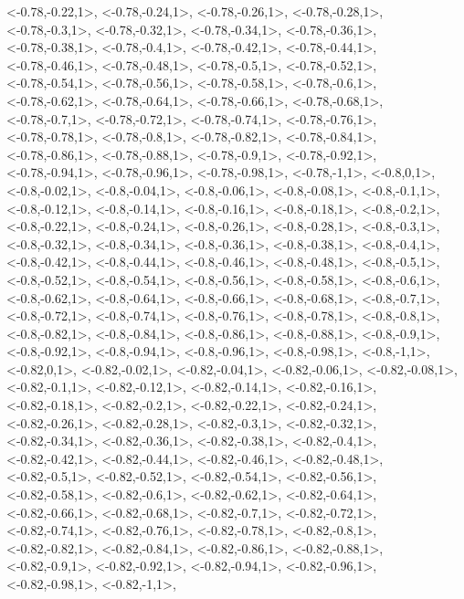 \documentclass[a4paper,10pt]{article}
\begin{document}
\begin{eulernotebook}
\begin{euleroutput}
  <-0.78,-0.22,1>,
  <-0.78,-0.24,1>,
  <-0.78,-0.26,1>,
  <-0.78,-0.28,1>,
  <-0.78,-0.3,1>,
  <-0.78,-0.32,1>,
  <-0.78,-0.34,1>,
  <-0.78,-0.36,1>,
  <-0.78,-0.38,1>,
  <-0.78,-0.4,1>,
  <-0.78,-0.42,1>,
  <-0.78,-0.44,1>,
  <-0.78,-0.46,1>,
  <-0.78,-0.48,1>,
  <-0.78,-0.5,1>,
  <-0.78,-0.52,1>,
  <-0.78,-0.54,1>,
  <-0.78,-0.56,1>,
  <-0.78,-0.58,1>,
  <-0.78,-0.6,1>,
  <-0.78,-0.62,1>,
  <-0.78,-0.64,1>,
  <-0.78,-0.66,1>,
  <-0.78,-0.68,1>,
  <-0.78,-0.7,1>,
  <-0.78,-0.72,1>,
  <-0.78,-0.74,1>,
  <-0.78,-0.76,1>,
  <-0.78,-0.78,1>,
  <-0.78,-0.8,1>,
  <-0.78,-0.82,1>,
  <-0.78,-0.84,1>,
  <-0.78,-0.86,1>,
  <-0.78,-0.88,1>,
  <-0.78,-0.9,1>,
  <-0.78,-0.92,1>,
  <-0.78,-0.94,1>,
  <-0.78,-0.96,1>,
  <-0.78,-0.98,1>,
  <-0.78,-1,1>,
  <-0.8,0,1>,
  <-0.8,-0.02,1>,
  <-0.8,-0.04,1>,
  <-0.8,-0.06,1>,
  <-0.8,-0.08,1>,
  <-0.8,-0.1,1>,
  <-0.8,-0.12,1>,
  <-0.8,-0.14,1>,
  <-0.8,-0.16,1>,
  <-0.8,-0.18,1>,
  <-0.8,-0.2,1>,
  <-0.8,-0.22,1>,
  <-0.8,-0.24,1>,
  <-0.8,-0.26,1>,
  <-0.8,-0.28,1>,
  <-0.8,-0.3,1>,
  <-0.8,-0.32,1>,
  <-0.8,-0.34,1>,
  <-0.8,-0.36,1>,
  <-0.8,-0.38,1>,
  <-0.8,-0.4,1>,
  <-0.8,-0.42,1>,
  <-0.8,-0.44,1>,
  <-0.8,-0.46,1>,
  <-0.8,-0.48,1>,
  <-0.8,-0.5,1>,
  <-0.8,-0.52,1>,
  <-0.8,-0.54,1>,
  <-0.8,-0.56,1>,
  <-0.8,-0.58,1>,
  <-0.8,-0.6,1>,
  <-0.8,-0.62,1>,
  <-0.8,-0.64,1>,
  <-0.8,-0.66,1>,
  <-0.8,-0.68,1>,
  <-0.8,-0.7,1>,
  <-0.8,-0.72,1>,
  <-0.8,-0.74,1>,
  <-0.8,-0.76,1>,
  <-0.8,-0.78,1>,
  <-0.8,-0.8,1>,
  <-0.8,-0.82,1>,
  <-0.8,-0.84,1>,
  <-0.8,-0.86,1>,
  <-0.8,-0.88,1>,
  <-0.8,-0.9,1>,
  <-0.8,-0.92,1>,
  <-0.8,-0.94,1>,
  <-0.8,-0.96,1>,
  <-0.8,-0.98,1>,
  <-0.8,-1,1>,
  <-0.82,0,1>,
  <-0.82,-0.02,1>,
  <-0.82,-0.04,1>,
  <-0.82,-0.06,1>,
  <-0.82,-0.08,1>,
  <-0.82,-0.1,1>,
  <-0.82,-0.12,1>,
  <-0.82,-0.14,1>,
  <-0.82,-0.16,1>,
  <-0.82,-0.18,1>,
  <-0.82,-0.2,1>,
  <-0.82,-0.22,1>,
  <-0.82,-0.24,1>,
  <-0.82,-0.26,1>,
  <-0.82,-0.28,1>,
  <-0.82,-0.3,1>,
  <-0.82,-0.32,1>,
  <-0.82,-0.34,1>,
  <-0.82,-0.36,1>,
  <-0.82,-0.38,1>,
  <-0.82,-0.4,1>,
  <-0.82,-0.42,1>,
  <-0.82,-0.44,1>,
  <-0.82,-0.46,1>,
  <-0.82,-0.48,1>,
  <-0.82,-0.5,1>,
  <-0.82,-0.52,1>,
  <-0.82,-0.54,1>,
  <-0.82,-0.56,1>,
  <-0.82,-0.58,1>,
  <-0.82,-0.6,1>,
  <-0.82,-0.62,1>,
  <-0.82,-0.64,1>,
  <-0.82,-0.66,1>,
  <-0.82,-0.68,1>,
  <-0.82,-0.7,1>,
  <-0.82,-0.72,1>,
  <-0.82,-0.74,1>,
  <-0.82,-0.76,1>,
  <-0.82,-0.78,1>,
  <-0.82,-0.8,1>,
  <-0.82,-0.82,1>,
  <-0.82,-0.84,1>,
  <-0.82,-0.86,1>,
  <-0.82,-0.88,1>,
  <-0.82,-0.9,1>,
  <-0.82,-0.92,1>,
  <-0.82,-0.94,1>,
  <-0.82,-0.96,1>,
  <-0.82,-0.98,1>,
  <-0.82,-1,1>,

\end{euleroutput}
\end{eulernotebook}
\end{document}
